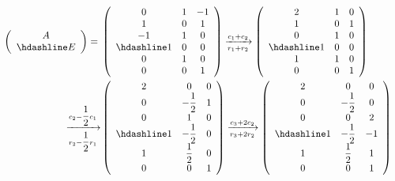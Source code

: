 \begin{solution}
    \begin{align*}
        \left(\begin{array}{c}
            A \\ \hdashline E
        \end{array}\right) ={} & \left(\begin{array}{ccc}
            0 & 1 & -1 \\
            1 & 0 & 1  \\
            -1 & 1 & 0 \\
            \hdashline
            1 & 0 & 0 \\
            0 & 1 & 0 \\
            0 & 0 & 1
        \end{array}\right)
        \xrightarrow[r_1+r_2]{c_1+c_2} \left(\begin{array}{ccc}
            2 & 1 & 0 \\
            1 & 0 & 1  \\
            0 & 1 & 0 \\
            \hdashline
            1 & 0 & 0 \\
            1 & 1 & 0 \\
            0 & 0 & 1
        \end{array}\right) & \\
        \xrightarrow[r_2-\dfrac{1}{2}r_1]{c_2-\dfrac{1}{2}c_1} & \left(\begin{array}{ccc}
            2 & 0 & 0 \\
            0 & -\dfrac{1}{2} & 1  \\
            0 & 1 & 0 \\
            \hdashline
            1 & -\dfrac{1}{2} & 0 \\
            1 & \dfrac{1}{2} & 0 \\
            0 & 0 & 1
        \end{array}\right)
        \xrightarrow[r_3+2r_2]{c_3+2c_2} \left(\begin{array}{ccc}
            2 & 0 & 0 \\
            0 & -\dfrac{1}{2} & 0  \\
            0 & 0 & 2 \\
            \hdashline
            1 & -\dfrac{1}{2} & -1 \\
            1 & \dfrac{1}{2} & 1 \\
            0 & 0 & 1
        \end{array}\right) & \\
    \end{align*}
\end{solution}


